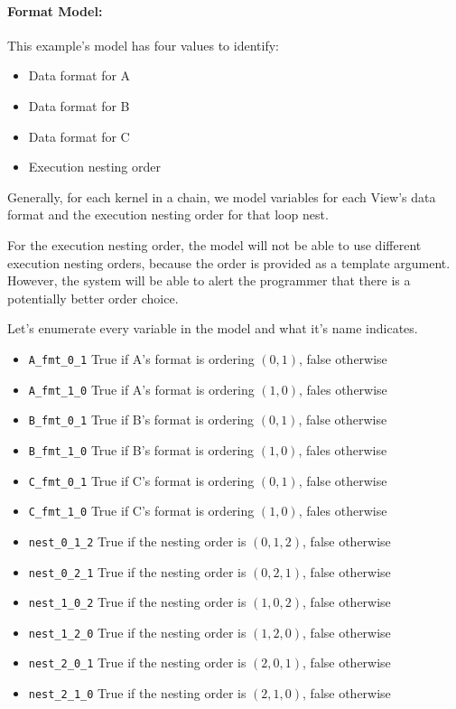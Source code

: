 \documentclass{article}
\begin{document}
\paragraph{Format Model:}
This example's model has four values to identify:
\begin{itemize}
    \item Data format for A
    \item Data format for B
    \item Data format for C
    \item Execution nesting order
\end{itemize}
Generally, for each kernel in a chain, we model variables for each View's data format and the execution nesting order for that loop nest.


For the execution nesting order, the model will not be able to use different execution nesting orders, because the order is provided as a template argument. 
However, the system will be able to alert the programmer that there is a potentially better order choice.

Let's enumerate every variable in the model and what it's name indicates. 
\begin{itemize}
    \item \verb.A_fmt_0_1. True if A's format is ordering $(0,1)$, false otherwise
    \item \verb.A_fmt_1_0. True if A's format is ordering $(1,0)$, fales otherwise
    \item \verb.B_fmt_0_1. True if B's format is ordering $(0,1)$, false otherwise
    \item \verb.B_fmt_1_0. True if B's format is ordering $(1,0)$, fales otherwise
    \item \verb.C_fmt_0_1. True if C's format is ordering $(0,1)$, false otherwise
    \item \verb.C_fmt_1_0. True if C's format is ordering $(1,0)$, fales otherwise
    \item \verb.nest_0_1_2. True if the nesting order is $(0,1,2)$, false otherwise
    \item \verb.nest_0_2_1. True if the nesting order is $(0,2,1)$, false otherwise
    \item \verb.nest_1_0_2. True if the nesting order is $(1,0,2)$, false otherwise
    \item \verb.nest_1_2_0. True if the nesting order is $(1,2,0)$, false otherwise
    \item \verb.nest_2_0_1. True if the nesting order is $(2,0,1)$, false otherwise
    \item \verb.nest_2_1_0. True if the nesting order is $(2,1,0)$, false otherwise
\end{itemize}
\end{document}
